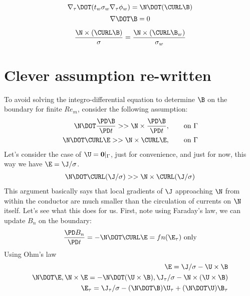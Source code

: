\documentclass[11pt]{article}
\begin{document}
\begin{equation}
  \nabla_{\tau} \DOT (t_w \sigma_w \nabla_{\tau} \phi_w) = \N \DOT (\CURL \B)
\end{equation}
\begin{equation}
  \nabla \DOT \B = 0
\end{equation}

\begin{equation}
  \frac{\N \times (\CURL \B)}{\sigma} = \frac{\N \times (\CURL \B_w)}{\sigma_w}
\end{equation}

\newpage
\section{Clever assumption re-written}
To avoid solving the integro-differential equation to determine $\B$ on the boundary for finite $Re_m$, consider the following assumption:
\begin{equation}\begin{aligned}
  \N \DOT \frac{\PD \B}{\PD t} >> \N \times \frac{\PD \B}{\PD t}, \qquad \text{on $\Gamma$} \\
  \N \DOT \CURL \E >> \N \times \CURL \E, \qquad \text{on $\Gamma$}
\end{aligned}\end{equation}
Let's consider the case of $\U = \mathbf{0}|_{\Gamma}$, just for convenience, and just for now, this way we have $\E = \J/\sigma$.
\begin{equation}\begin{aligned}
  \N \DOT \CURL (\J/\sigma) >> \N \times \CURL (\J/\sigma) \\
\end{aligned}\end{equation}
This argument basically says that local gradients of $\J$ approaching $\N$ from within the conductor are much smaller than the circulation of currents on $\N$ itself. Let's see what this does for us. First, note using Faraday's law, we can update $B_n$ on the boundary:
\begin{equation}\begin{aligned}
  \frac{\PD B_n}{\PD t} = - \N \DOT \CURL \E = fn(\E_{\tau}) \text{ only}
\end{aligned}\end{equation}
Using Ohm's law
\begin{equation}\begin{aligned}
  \E = \J/\sigma - \U \times \B \\
  \N\DOT \E,\N \times \E = -\N \DOT (\U \times \B), \J_{\tau}/\sigma - \N \times (\U \times \B) \\
  \E_{\tau} = \J_{\tau}/\sigma - (\N \DOT \B) \U_{\tau} + (\N \DOT \U) \B_{\tau}
\end{aligned}\end{equation}
\end{document}
